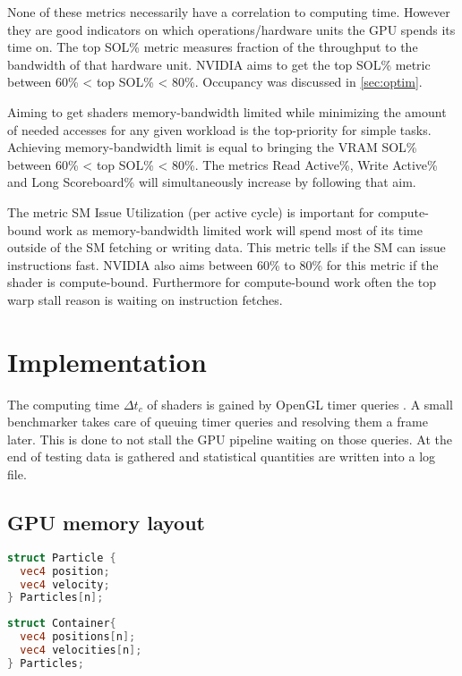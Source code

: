 \documentclass[m,times]{cgMA}
\begin{document}
None of these metrics necessarily have a correlation to computing time. However they are good indicators on which operations/hardware units the GPU spends its time on. The top SOL\% metric measures fraction of the throughput to the bandwidth of that hardware unit. NVIDIA aims to get the top SOL\% metric between 60\% < top SOL\% < 80\%. Occupancy was discussed in \ref{sec:optim}. \cite{NVIDIA:PEAK_PERFORMANCE}

Aiming to get shaders memory-bandwidth limited while minimizing the amount of needed accesses for any given workload is the top-priority for simple tasks. Achieving memory-bandwidth limit is equal to bringing the VRAM SOL\% between 60\% < top SOL\% < 80\%. The metrics Read Active\%, Write Active\% and Long Scoreboard\% will simultaneously increase by following that aim.

The metric SM Issue Utilization (per active cycle) is important for compute-bound work as memory-bandwidth limited work will spend most of its time outside of the SM fetching or writing data. This metric tells if the SM can issue instructions fast. NVIDIA also aims between 60\% to 80\% for this metric if the shader is compute-bound. Furthermore for compute-bound work often the top warp stall reason is waiting on instruction fetches.

\clearpage
\section{Implementation}\label{sec:implementation}
The computing time $\Delta t_c$ of shaders is gained by OpenGL timer queries \cite{KHRONOS:TIMER_QUERY}. A small benchmarker takes care of queuing timer queries and resolving them a frame later. This is done to not stall the GPU pipeline waiting on those queries. At the end of testing data is gathered and statistical quantities are written into a log file.
\subsection{GPU memory layout}\label{sec:soa_aos}
\noindent\begin{minipage}{0.45\textwidth}
\begin{lstlisting}[caption={AoS Layout},language={GLSL},style={GL}]
struct Particle {
  vec4 position;
  vec4 velocity;
} Particles[n];
\end{lstlisting}
\end{minipage}
\hfill\noindent\begin{minipage}{0.45\textwidth}
\begin{lstlisting}[caption={SoA Layout},label={llst:soa},language={GLSL},style={GL}]
struct Container{
  vec4 positions[n];
  vec4 velocities[n];
} Particles;
\end{lstlisting}
\end{minipage}
\end{document}
